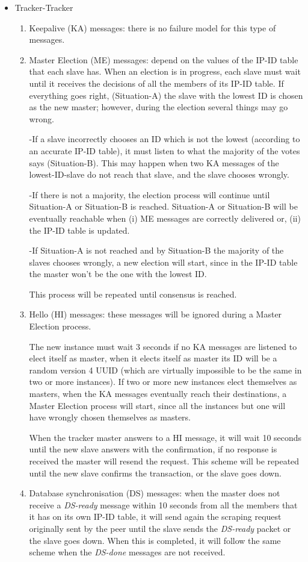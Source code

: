\documentclass[twoside,a4paper,10pt]{article}
\begin{document}
\begin{itemize}
\item Tracker-Tracker
  \begin{enumerate}
  \item Keepalive (KA) messages: there is no failure model for this type of
    messages.
  \item Master Election (ME) messages: depend on the values of the IP-ID table
    that each slave has. When an election is in progress, each slave must
    wait until it receives the decisions of all the members of its IP-ID table.
    If everything goes right, (Situation-A) the slave with the lowest ID is
    chosen as the new master; however, during the election several things may go
    wrong.
    
    -If a slave incorrectly chooses an ID which is not the lowest (according to
    an accurate IP-ID table),
    it must listen to what the majority of the votes says (Situation-B). This
    may happen when two  KA messages of the lowest-ID-slave do not reach
    that slave, and the slave chooses wrongly.
    
    -If there is not a majority, the election process will continue until
    Situation-A or Situation-B is reached. Situation-A or Situation-B will be
    eventually reachable when (i) ME messages are correctly delivered or, (ii)
    the IP-ID table is updated.

    -If Situation-A is not reached and by Situation-B the majority of the slaves
    chooses wrongly, a new election will start, since in the IP-ID table the
    master won't be the one with the lowest ID.
    
    This process will be repeated until consensus is reached. 
  \item Hello (HI) messages: these messages will be ignored during a Master
    Election process.

    The new instance must wait 3 seconds if no KA messages
    are listened to elect itself as master, when it elects itself as master
    its ID will be a random version 4 UUID (which are virtually impossible to
    be the same in two or more instances). If two or more new instances
    elect themselves as masters, when the KA messages eventually reach their
    destinations, a Master Election process will start, since all the instances
    but one will have wrongly chosen themselves as masters.

    When the tracker master answers to a HI message, it will wait 10 seconds
    until the new slave answers with the confirmation, if no response is
    received the master will resend the request. This scheme will be repeated
    until the new slave confirms the transaction, or the slave goes down.
  \item Database synchronisation (DS) messages:
    when the master does not
    receive a \emph{DS-ready} message within 10 seconds from all the members
    that it has on its own IP-ID table, it will send again the scraping request
    originally sent by the peer until the slave sends the \emph{DS-ready}
    packet or the slave goes down. When this is completed, it will follow the
    same scheme when the \emph{DS-done} messages are not received.
    

\end{enumerate}
\end{itemize}
\end{document}
